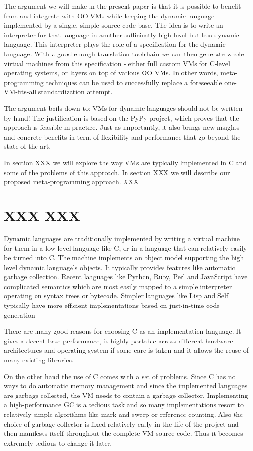 \documentclass{llncs}
\begin{document}
The argument we will make in the present paper is that it is possible to
benefit from and integrate with OO VMs while keeping the dynamic
language implemented by a single, simple source code base.  The idea is
to write an interpreter for that language in another sufficiently
high-level but less dynamic language.  This interpreter plays the role
of a specification for the dynamic language.  With a good enough
translation toolchain we can then generate whole virtual machines from
this specification - either full custom VMs for C-level operating
systems, or layers on top of various OO VMs.  In other words,
meta-programming techniques can be used to successfully replace a
foreseeable one-VM-fits-all standardization attempt.

The argument boils down to: VMs for dynamic languages should not be
written by hand!  The justification is based on the
PyPy project, which proves that the approach is
feasible in practice.  Just as importantly, it also brings new insights
and concrete benefits in term of flexibility and performance that go
beyond the state of the art.

In section XXX we will explore the way VMs are typically implemented
in C and some of the problems of this approach. In section XXX we will describe
our proposed meta-programming approach. XXX


\section{XXX XXX}

Dynamic languages are traditionally implemented by writing a virtual
machine for them in a low-level language like C, or in a language that
can relatively easily be turned into C.  The machine implements an
object model supporting the high level dynamic language's objects.  It
typically provides features like automatic garbage collection.  Recent
languages like Python, Ruby, Perl and JavaScript have complicated
semantics which are most easily mapped to a simple interpreter operating
on syntax trees or bytecode. Simpler languages like Lisp and Self
typically have more efficient implementations based on just-in-time code
generation.

There are many good reasons for choosing C as an implementation language. It
gives a decent base performance, is highly portable across different hardware
architectures and operating system if some care is taken and it allows the reuse
of many existing libraries.

On the other hand the use of C comes with a set of problems. Since C has no ways
to do automatic memory management and since the implemented languages are
garbage collected, the VM needs to contain a garbage collector. Implementing a
high-performance GC is a tedious task and so many implementations resort to
relatively simple algorithms like mark-and-sweep or reference counting. Also the
choice of garbage collector is fixed relatively early in the life of the project
and then manifests itself throughout the complete VM source code. Thus it
becomes extremely tedious to change it later.
\end{document}
